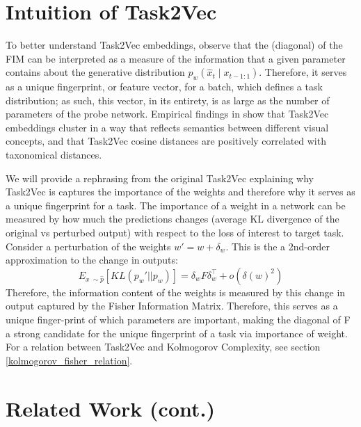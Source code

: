 \section{Intuition of Task2Vec}
\label{appendix:intuitiontask2vec}
To better understand Task2Vec embeddings, observe that the (diagonal) of the FIM can be interpreted as a measure of the information that a given parameter contains about the generative distribution $p_w(\hat x_t \mid x_{t-1:1})$. 
Therefore, it serves as a unique fingerprint, or feature vector, for a batch, which defines a task distribution; as such, this vector, in its entirety, is as large as the number of parameters of the probe network.
Empirical findings in \citep{task2vec} show that Task2Vec embeddings cluster in a way that reflects semantics between different visual concepts, and that Task2Vec cosine distances are positively correlated with taxonomical distances.

We will provide a rephrasing from the original Task2Vec \cite{task2vec} explaining why Task2Vec is captures the importance of the weights and therefore why it serves as a unique fingerprint for a task.
The importance of a weight in a network can be measured by how much the predictions changes (average KL divergence of the original vs perturbed output) with respect to the loss of interest to target task.
Consider a perturbation of the weights $w' = w + \delta_w$.
This is the a 2nd-order approximation to the change in outputs:
$$
E_{x ~\sim \hat{p}}[KL(p_w' || p_w)] = \delta_w F \delta_w^\top + o(\delta(w)^2)
$$
Therefore, the information content of the weights is measured by this change in output captured by the Fisher Information Matrix.
Therefore, this serves as a unique finger-print of which parameters are important, making the diagonal of F a strong candidate for the unique fingerprint of a task via importance of weight.
For a relation between Task2Vec and Kolmogorov Complexity, see section \ref{kolmogorov_fisher_relation}.

\section{Related Work (cont.)}\label{related_work_cont}


